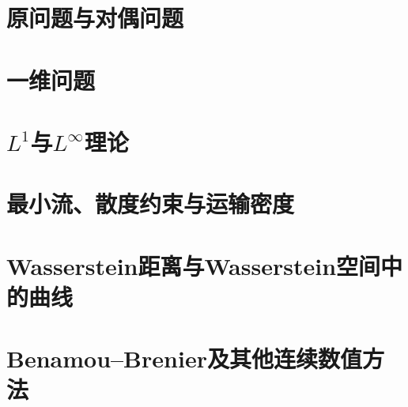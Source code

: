 \documentclass[UTF8,12pt]{ctexart}
\theoremstyle{plain}
\theoremstyle{definition}
\theoremstyle{plain}
\numberwithin{equation}{section}
\numberwithin{figure}{section}
\theoremstyle{boxedsource}
\theoremstyle{plain}
\begin{document}
\hypersetup{pageanchor=false}

\hypersetup{pageanchor=true}




\clearpage\tableofcontents\clearpage


\clearpage{}
\setcounter{footnote}{0}
\section[原问题与对偶问题]{原问题与对偶问题}\label{sec:1}







\setcounter{footnote}{0}
\section[一维问题]{一维问题}\label{sec:2}





\setcounter{footnote}{0}
\section[L1与L∞理论]{$L^1$与$L^\infty$理论}\label{sec:3}



\setcounter{footnote}{0}
\section[最小流、散度约束与运输密度]{最小流、散度约束与运输密度}\label{sec:4}




\setcounter{footnote}{0}
\section[Wasserstein距离与Wasserstein空间中的曲线]{Wasserstein距离与Wasserstein空间中的曲线}\label{sec:5}





\setcounter{footnote}{0}
\section[Benamou--Brenier及其他连续数值方法]{Benamou--Brenier及其他连续数值方法}\label{sec:6}




\setcounter{footnote}{0}
\end{document}
